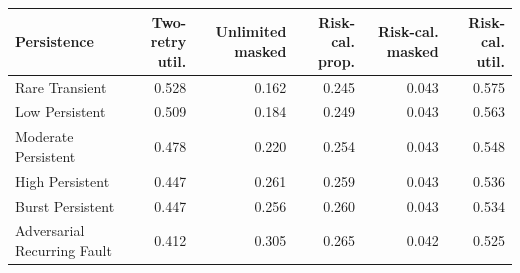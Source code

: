 \begin{tabular}{lrrrrr}
\toprule
Persistence & Two-retry util. & Unlimited masked & Risk-cal. prop. & Risk-cal. masked & Risk-cal. util. \\
\midrule
Rare Transient & 0.528 & 0.162 & 0.245 & 0.043 & 0.575 \\
Low Persistent & 0.509 & 0.184 & 0.249 & 0.043 & 0.563 \\
Moderate Persistent & 0.478 & 0.220 & 0.254 & 0.043 & 0.548 \\
High Persistent & 0.447 & 0.261 & 0.259 & 0.043 & 0.536 \\
Burst Persistent & 0.447 & 0.256 & 0.260 & 0.043 & 0.534 \\
Adversarial Recurring Fault & 0.412 & 0.305 & 0.265 & 0.042 & 0.525 \\
\bottomrule
\end{tabular}
